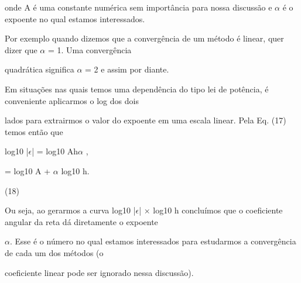 \documentclass[a4paper,portrait,12pt]{article}
\begin{document}
\begin{flushleft}
onde A \'{e} uma constante num\'{e}rica sem import\^{a}ncia para nossa discuss\~{a}o e $\alpha$ \'{e} o expoente no qual estamos interessados.
\end{flushleft}


\begin{flushleft}
Por exemplo quando dizemos que a converg\^{e}ncia de um m\'{e}todo \'{e} linear, quer dizer que $\alpha$ = 1. Uma converg\^{e}ncia
\end{flushleft}


\begin{flushleft}
quadr\'{a}tica significa $\alpha$ = 2 e assim por diante.
\end{flushleft}


\begin{flushleft}
Em situa\c{c}\~{o}es nas quais temos uma depend\^{e}ncia do tipo lei de pot\^{e}ncia, \'{e} conveniente aplicarmos o log dos dois
\end{flushleft}


\begin{flushleft}
lados para extrairmos o valor do expoente em uma escala linear. Pela Eq. (17) temos ent\~{a}o que
\end{flushleft}


\begin{flushleft}
log10 |$\epsilon$| = log10 Ah$\alpha$ ,
\end{flushleft}


\begin{flushleft}
= log10 A + $\alpha$ log10 h.
\end{flushleft}





(18)





\begin{flushleft}
Ou seja, ao gerarmos a curva log10 |$\epsilon$| × log10 h conclu\'{i}mos que o coeficiente angular da reta d\'{a} diretamente o expoente
\end{flushleft}


\begin{flushleft}
$\alpha$. Esse \'{e} o n\'{u}mero no qual estamos interessados para estudarmos a converg\^{e}ncia de cada um dos m\'{e}todos (o
\end{flushleft}


\begin{flushleft}
coeficiente linear pode ser ignorado nessa discuss\~{a}o).
\end{flushleft}
\end{document}
